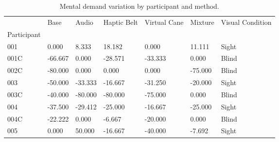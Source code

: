 
\begin{table}[!htb]
\centering
\caption{Mental demand variation by participant and method.}
\label{tab:md_variation}
\begin{tabular}{lllllll}
\toprule
{} &    Base &   Audio &  Haptic Belt &  Virtual Cane &  Mixture & Visual Condition \\
Participant &         &         &              &               &          &                  \\
\midrule
001         &   0.000 &   8.333 &       18.182 &         0.000 &   11.111 &            Sight \\
001C        & -66.667 &   0.000 &      -28.571 &       -33.333 &    0.000 &            Blind \\
002C        & -80.000 &   0.000 &        0.000 &         0.000 &  -75.000 &            Blind \\
003         & -50.000 & -33.333 &      -16.667 &       -31.250 &  -20.000 &            Sight \\
003C        & -40.000 & -80.000 &      -80.000 &       -75.000 &    0.000 &            Blind \\
004         & -37.500 & -29.412 &      -25.000 &       -16.667 &  -25.000 &            Sight \\
004C        & -22.222 &   0.000 &       -6.667 &       -20.000 &    0.000 &            Blind \\
005         &   0.000 &  50.000 &      -16.667 &       -40.000 &   -7.692 &            Sight \\
\bottomrule
\end{tabular}
\end{table}

